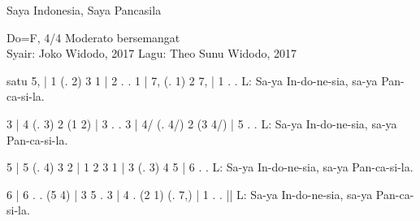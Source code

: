 \documentclass{article}
\begin{document}
\thispagestyle{empty}
\begin{center}
{\huge Saya Indonesia, Saya Pancasila}


{\normalsize Do=F, 4/4 Moderato bersemangat}\\
Syair: Joko Widodo, 2017 \hfill Lagu: Theo Sunu Widodo, 2017
\end{center}
\begin{numnot}[1]{satu}
5, | 1 (. 2) 3 1 | 2 . . 1 | 7, (. 1) 2 7, | 1 . .
L: Sa-ya In-do-ne-sia, sa-ya Pan-ca-si-la.

3 | 4 (. 3) 2 {(1 2)} | 3 . . 3 | 4/ (. 4/) 2 {(3 4/)} | 5 . .
L: Sa-ya In-do-ne-sia, sa-ya Pan-ca-si-la.

5 | 5 (. 4) 3 2 | {1 2 3} 1 | 3 (. 3) 4 5 | 6 . .
L: Sa-ya In-do-ne-sia, sa-ya Pan-ca-si-la.

6 | 6 . . (5 4) | 3 5 . 3 | 4 . (2 1) (. 7,) | 1 . . ||
L: Sa-ya In-do-ne-sia, sa-ya Pan-ca-si-la.
\end{numnot}
\end{document}
